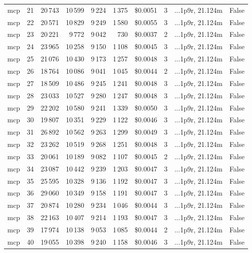 \documentclass[a4paper,11pt]{article}
\begin{document}
\begin{table}[H]
{\begin{tabular}{l r r r r r r r l r}
mcp & 21 & 20\,743 & 10\,599 & 9\,224 & 1\,375 & \$0.0051 & 3 & ...1p9r, 21.124m & False \\
mcp & 22 & 20\,571 & 10\,829 & 9\,249 & 1\,580 & \$0.0055 & 3 & ...1p9r, 21.124m & False \\
mcp & 23 & 20\,221 & 9\,772 & 9\,042 & 730 & \$0.0037 & 2 & ...1p9r, 21.124m & False \\
mcp & 24 & 23\,965 & 10\,258 & 9\,150 & 1\,108 & \$0.0045 & 3 & ...1p9r, 21.124m & False \\
mcp & 25 & 21\,076 & 10\,430 & 9\,173 & 1\,257 & \$0.0048 & 3 & ...1p9r, 21.124m & False \\
mcp & 26 & 18\,764 & 10\,086 & 9\,041 & 1\,045 & \$0.0044 & 2 & ...1p9r, 21.124m & False \\
mcp & 27 & 18\,509 & 10\,486 & 9\,245 & 1\,241 & \$0.0048 & 3 & ...1p9r, 21.124m & False \\
mcp & 28 & 23\,033 & 10\,527 & 9\,280 & 1\,247 & \$0.0048 & 3 & ...1p9r, 21.124m & False \\
mcp & 29 & 22\,202 & 10\,580 & 9\,241 & 1\,339 & \$0.0050 & 3 & ...1p9r, 21.124m & False \\
mcp & 30 & 19\,807 & 10\,351 & 9\,229 & 1\,122 & \$0.0046 & 3 & ...1p9r, 21.124m & False \\
mcp & 31 & 26\,892 & 10\,562 & 9\,263 & 1\,299 & \$0.0049 & 3 & ...1p9r, 21.124m & False \\
mcp & 32 & 23\,262 & 10\,519 & 9\,268 & 1\,251 & \$0.0048 & 3 & ...1p9r, 21.124m & False \\
mcp & 33 & 20\,061 & 10\,189 & 9\,082 & 1\,107 & \$0.0045 & 2 & ...1p9r, 21.124m & False \\
mcp & 34 & 23\,087 & 10\,442 & 9\,239 & 1\,203 & \$0.0047 & 3 & ...1p9r, 21.124m & False \\
mcp & 35 & 25\,595 & 10\,328 & 9\,136 & 1\,192 & \$0.0047 & 3 & ...1p9r, 21.124m & False \\
mcp & 36 & 29\,060 & 10\,349 & 9\,158 & 1\,191 & \$0.0047 & 3 & ...1p9r, 21.124m & False \\
mcp & 37 & 20\,874 & 10\,280 & 9\,234 & 1\,046 & \$0.0044 & 3 & ...1p9r, 21.124m & False \\
mcp & 38 & 22\,163 & 10\,407 & 9\,214 & 1\,193 & \$0.0047 & 3 & ...1p9r, 21.124m & False \\
mcp & 39 & 17\,974 & 10\,138 & 9\,053 & 1\,085 & \$0.0044 & 2 & ...1p9r, 21.124m & False \\
mcp & 40 & 19\,055 & 10\,398 & 9\,240 & 1\,158 & \$0.0046 & 3 & ...1p9r, 21.124m & False \\

\end{tabular}}
\end{table}
\end{document}
